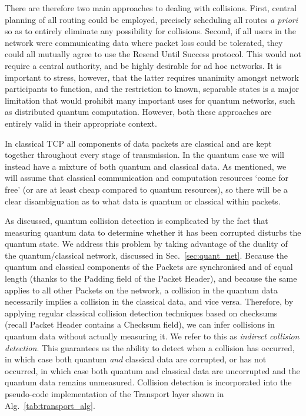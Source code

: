 \documentclass[aps,rmp,twocolumn,amsmath,amssymb,nofootinbib,superscriptaddress,longbibliography,floatfix]{revtex4-1}
\begin{document}
There are therefore two main approaches to dealing with collisions. First, central planning of all routing could be employed, precisely scheduling all routes \emph{a priori} so as to entirely eliminate any possibility for collisions. Second, if all users in the network were communicating data where packet loss could be tolerated, they could all mutually agree to use the {\sc Resend Until Success} protocol. This would not require a central authority, and be highly desirable for ad hoc networks. It is important to stress, however, that the latter requires unanimity amongst network participants to function, and the restriction to known, separable states is a major limitation that would prohibit many important uses for quantum networks, such as distributed quantum computation. However, both these approaches are entirely valid in their appropriate context.

In classical TCP all components of data packets are classical and are kept together throughout every stage of transmission. In the quantum case we will instead have a mixture of both quantum and classical data. As mentioned, we will assume that classical communication and computation resources `come for free' (or are at least cheap compared to quantum resources), so there will be a clear disambiguation as to what data is quantum or classical within packets.

As discussed, quantum collision detection is complicated by the fact that measuring quantum data to determine whether it has been corrupted disturbs the quantum state. We address this problem by taking advantage of the duality of the quantum/classical network, discussed in Sec.~\ref{sec:quant_net}. Because the quantum and classical components of the {\sc Packets} are synchronised and of equal length (thanks to the {\sc Padding} field of the {\sc Packet Header}), and because the same applies to all other {\sc Packets} on the network, a collision in the quantum data necessarily implies a collision in the classical data, and vice versa. Therefore, by applying regular classical collision detection techniques based on checksums (recall {\sc Packet Header} contains a {\sc Checksum} field), we can infer collisions in quantum data without actually measuring it. We refer to this as \emph{indirect collision detection}. This guarantees us the ability to detect when a collision has occurred, in which case both quantum \emph{and} classical data are corrupted, or has not occurred, in which case both quantum and classical data are uncorrupted and the quantum data remains unmeasured. Collision detection is incorporated into the pseudo-code implementation of the {\sc Transport} layer shown in Alg.~\ref{tab:transport_alg}.
\end{document}
